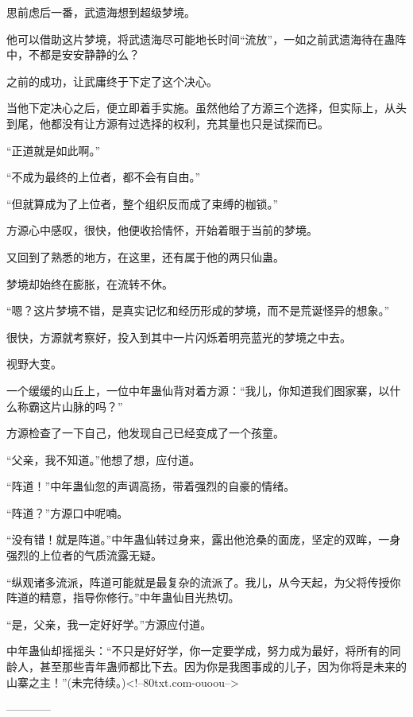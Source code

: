 \begin{this_body}
思前虑后一番，武遗海想到超级梦境。

他可以借助这片梦境，将武遗海尽可能地长时间“流放”，一如之前武遗海待在蛊阵中，不都是安安静静的么？

之前的成功，让武庸终于下定了这个决心。

当他下定决心之后，便立即着手实施。虽然他给了方源三个选择，但实际上，从头到尾，他都没有让方源有过选择的权利，充其量也只是试探而已。

“正道就是如此啊。”

“不成为最终的上位者，都不会有自由。”

“但就算成为了上位者，整个组织反而成了束缚的枷锁。”

方源心中感叹，很快，他便收拾情怀，开始着眼于当前的梦境。

又回到了熟悉的地方，在这里，还有属于他的两只仙蛊。

梦境却始终在膨胀，在流转不休。

“嗯？这片梦境不错，是真实记忆和经历形成的梦境，而不是荒诞怪异的想象。”

很快，方源就考察好，投入到其中一片闪烁着明亮蓝光的梦境之中去。

视野大变。

一个缓缓的山丘上，一位中年蛊仙背对着方源：“我儿，你知道我们图家寨，以什么称霸这片山脉的吗？”

方源检查了一下自己，他发现自己已经变成了一个孩童。

“父亲，我不知道。”他想了想，应付道。

“阵道！”中年蛊仙忽的声调高扬，带着强烈的自豪的情绪。

“阵道？”方源口中呢喃。

“没有错！就是阵道。”中年蛊仙转过身来，露出他沧桑的面庞，坚定的双眸，一身强烈的上位者的气质流露无疑。

“纵观诸多流派，阵道可能就是最复杂的流派了。我儿，从今天起，为父将传授你阵道的精意，指导你修行。”中年蛊仙目光热切。

“是，父亲，我一定好好学。”方源应付道。

中年蛊仙却摇摇头：“不只是好好学，你一定要学成，努力成为最好，将所有的同龄人，甚至那些青年蛊师都比下去。因为你是我图事成的儿子，因为你将是未来的山寨之主！”(未完待续。)<!--80txt.com-ouoou-->

------------

\end{this_body}

